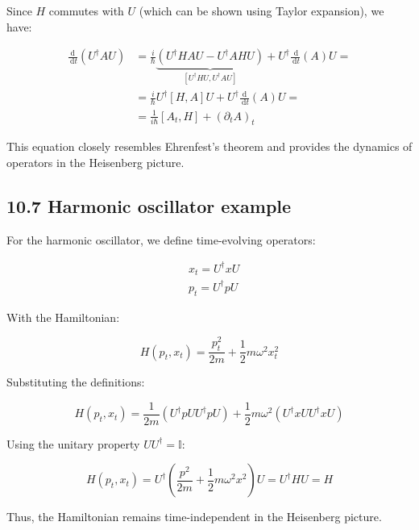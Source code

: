 \documentclass[italian]{HKNdocument}
\begin{document}
Since $H$ commutes with $U$ (which can be shown using Taylor expansion), we have:

\begin{align*}
\frac{\mathrm{d}}{\mathrm{~d} t}\left(U^{\dagger} A U\right) & =\frac{i}{\hbar} \underbrace{\left(U^{\dagger} H A U-U^{\dagger} A H U\right)}_{\left[U^{\dagger}HU, U^{\dagger}AU\right]}+U^{\dagger} \frac{\mathrm{~d}}{\mathrm{~d} t}(A) U= \\
& =\frac{i}{\hbar} U^{\dagger}[H,A]U + U^{\dagger} \frac{\mathrm{d}}{\mathrm{~d} t}(A) U= \\
& =\frac{1}{i \hbar}\left[A_{t}, H\right]+\left(\partial_{t} A\right)_{t} \tag{10.42}
\end{align*}

This equation closely resembles Ehrenfest's theorem and provides the dynamics of operators in the Heisenberg picture.

\subsection*{10.7 Harmonic oscillator example}
For the harmonic oscillator, we define time-evolving operators:

\begin{align*}
& x_{t}=U^{\dagger} x U \\
& p_{t}=U^{\dagger} p U \tag{10.43}
\end{align*}

With the Hamiltonian:

\begin{equation*}
H\left(p_{t}, x_{t}\right)=\frac{p_{t}^{2}}{2 m}+\frac{1}{2} m \omega^{2} x_{t}^{2} \tag{10.44}
\end{equation*}

Substituting the definitions:

\begin{equation*}
H\left(p_{t}, x_{t}\right)=\frac{1}{2 m}\left(U^{\dagger} p U U^{\dagger} p U\right) + \frac{1}{2} m \omega^{2}\left(U^{\dagger} x U U^{\dagger} x U\right) \tag{10.45}
\end{equation*}

Using the unitary property $U U^{\dagger}=\mathbb{I}$:

\begin{equation*}
H\left(p_{t}, x_{t}\right)=U^{\dagger}\left(\frac{p^{2}}{2 m}+\frac{1}{2} m \omega^{2} x^{2}\right) U=U^{\dagger} H U=H \tag{10.46}
\end{equation*}

Thus, the Hamiltonian remains time-independent in the Heisenberg picture.
\end{document}

